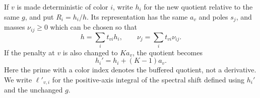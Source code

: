 \begin{lemma}
If $v$ is made deterministic of color $i$, write $h_i$ for the new quotient
relative to the same $g$, and put $R_i=h_i/h$. Its representation has the same $a_v$ and poles
$s_j$, and masses $\nu_{ij}\geq0$ which can be chosen so that
\begin{equation}\label{poly:pin-average}
 h=\sum_i t_{vi}h_i,\qquad
 \nu_j=\sum_i t_{vi}\nu_{ij}.
\end{equation}
If the penalty at $v$ is also changed to $Ka_v$, the quotient becomes
\begin{equation}\label{poly:buffered-quotient}
 h_i'=h_i+(K-1)a_v.
\end{equation}
Here the prime with a color index denotes the buffered quotient, not a
derivative. We write $\ell'_{v,i}$ for the positive-axis integral of
the spectral shift defined using $h_i'$ and the unchanged $g$.
\end{lemma}


